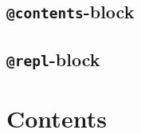 \label{9556992122115066742}{}


\subsection{\texttt{@contents}-block}



\label{13075913611254739026}{}


\subsection{\texttt{@repl}-block}



\label{232707879404840654}{}


\section{Contents}



\label{3267187559256225091}{}

